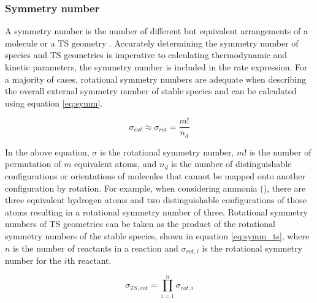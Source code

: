 \documentclass[preprint, 11pt]{elsarticle} %
\begin{document}

\subsubsection{Symmetry number}

A symmetry number is the number of different but equivalent arrangements of a molecule or a TS geometry \cite{FernandezRamos:2007}.
Accurately determining the symmetry number of species and TS geometries is imperative to calculating thermodynamic and kinetic parameters, the symmetry number is included in the rate expression.
For a majority of cases, rotational symmetry numbers are adequate when describing the overall external symmetry number of stable species and can be calculated using equation \ref{eq:symm}.

\begin{equation}
    \label{eq:symm}
    \sigma_{ext} \approx \sigma_{rot} = \frac{m!}{n_d}
\end{equation}

In the above equation, $\sigma$ is the rotational symmetry number, $m!$ is the number of permutation of $m$ equivalent atoms, and $n_d$ is the number of distinguishable configurations or orientations of molecules that cannot be mapped onto another configuration by rotation.
For example, when considering ammonia (), there are three equivalent hydrogen atoms and two distinguishable configurations of those atoms resulting in a rotational symmetry number of three.
Rotational symmetry numbers of TS geometries can be taken as the product of the rotational symmetry numbers of the stable species, shown in equation \ref{eq:symm_ts}, where $n$ is the number of reactants in a reaction and $\sigma_{rot,i}$ is the rotational symmetry number for the $i$th reactant.

\begin{equation}
    \sigma_{TS,rot} = \prod^n_{i=1}\sigma_{rot,i}
    \label{eq:symm_ts}
\end{equation}
\end{document}
